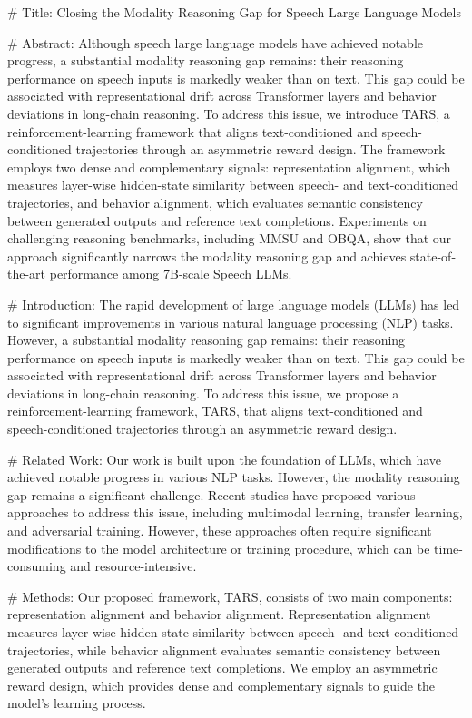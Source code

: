         # Title:
        Closing the Modality Reasoning Gap for Speech Large Language Models

        # Abstract:
        Although speech large language models have achieved notable progress, a substantial modality reasoning gap remains: their reasoning performance on speech inputs is markedly weaker than on text. This gap could be associated with representational drift across Transformer layers and behavior deviations in long-chain reasoning. To address this issue, we introduce TARS, a reinforcement-learning framework that aligns text-conditioned and speech-conditioned trajectories through an asymmetric reward design. The framework employs two dense and complementary signals: representation alignment, which measures layer-wise hidden-state similarity between speech- and text-conditioned trajectories, and behavior alignment, which evaluates semantic consistency between generated outputs and reference text completions. Experiments on challenging reasoning benchmarks, including MMSU and OBQA, show that our approach significantly narrows the modality reasoning gap and achieves state-of-the-art performance among 7B-scale Speech LLMs.

        # Introduction:
        The rapid development of large language models (LLMs) has led to significant improvements in various natural language processing (NLP) tasks. However, a substantial modality reasoning gap remains: their reasoning performance on speech inputs is markedly weaker than on text. This gap could be associated with representational drift across Transformer layers and behavior deviations in long-chain reasoning. To address this issue, we propose a reinforcement-learning framework, TARS, that aligns text-conditioned and speech-conditioned trajectories through an asymmetric reward design.

        # Related Work:
        Our work is built upon the foundation of LLMs, which have achieved notable progress in various NLP tasks. However, the modality reasoning gap remains a significant challenge. Recent studies have proposed various approaches to address this issue, including multimodal learning, transfer learning, and adversarial training. However, these approaches often require significant modifications to the model architecture or training procedure, which can be time-consuming and resource-intensive.

        # Methods:
        Our proposed framework, TARS, consists of two main components: representation alignment and behavior alignment. Representation alignment measures layer-wise hidden-state similarity between speech- and text-conditioned trajectories, while behavior alignment evaluates semantic consistency between generated outputs and reference text completions. We employ an asymmetric reward design, which provides dense and complementary signals to guide the model's learning process.


